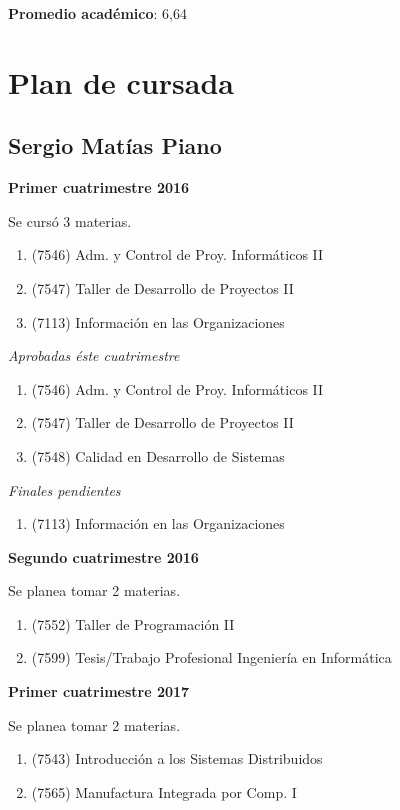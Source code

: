 \documentclass[a4paper,11pt]{article}
\begin{document}
\textbf{Promedio académico}: 6,64

\section{Plan de cursada}

\subsection{Sergio Matías Piano}

\noindent \textbf{Primer cuatrimestre 2016}

\noindent Se cursó 3 materias. \\

\begin{enumerate}
  \item (7546) Adm. y Control de Proy. Informáticos II \\
  \item (7547) Taller de Desarrollo de Proyectos II \\
  \item (7113) Información en las Organizaciones \\
\end{enumerate}

\noindent \emph{Aprobadas éste cuatrimestre}

\begin{enumerate}
  \item (7546) Adm. y Control de Proy. Informáticos II \\
  \item (7547) Taller de Desarrollo de Proyectos II \\
  \item (7548) Calidad en Desarrollo de Sistemas \\
\end{enumerate}

\noindent \emph{Finales pendientes}

\begin{enumerate}
  \item (7113) Información en las Organizaciones \\
\end{enumerate}

\noindent \textbf{Segundo cuatrimestre 2016}

\noindent Se planea tomar 2 materias. \\

\begin{enumerate}
  \item (7552) Taller de Programación II \\
  \item (7599) Tesis/Trabajo Profesional Ingeniería en Informática \\
\end{enumerate}

\noindent \textbf{Primer cuatrimestre 2017}

\noindent Se planea tomar 2 materias. \\

\begin{enumerate}
  \item (7543) Introducción a los Sistemas Distribuidos \\
  \item (7565) Manufactura Integrada por Comp. I \\
\end{enumerate}
\end{document}
